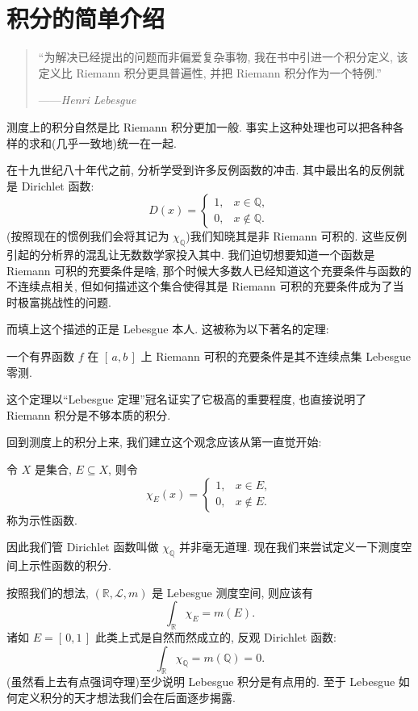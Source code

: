 \section{积分的简单介绍}
\begin{quote}
    ``为解决已经提出的问题而非偏爱复杂事物, 我在书中引进一个积分定义, 该定义比 Riemann 积分更具普遍性, 并把 Riemann 积分作为一个特例.''\par\hfill ------\emph{Henri Lebesgue}
\end{quote}

测度上的积分自然是比 Riemann 积分更加一般. 事实上这种处理也可以把各种各样的求和(几乎一致地)统一在一起.

在十九世纪八十年代之前, 分析学受到许多反例函数的冲击. 其中最出名的反例就是 Dirichlet 函数:
\[
    D(x) = \begin{cases}
        1, & x\in\mathbb Q,    \\
        0, & x\notin\mathbb Q.
    \end{cases}
\]
(按照现在的惯例我们会将其记为 $\chi_{\mathbb Q}$)我们知晓其是非 Riemann 可积的. 这些反例引起的分析界的混乱让无数数学家投入其中. 我们迫切想要知道一个函数是 Riemann 可积的充要条件是啥, 那个时候大多数人已经知道这个充要条件与函数的不连续点相关, 但如何描述这个集合使得其是 Riemann 可积的充要条件成为了当时极富挑战性的问题\enote.

而填上这个描述的正是 Lebesgue 本人. 这被称为以下著名的定理:
\begin{theorem}[Lebesgue 定理]
    一个有界函数 $f$ 在 $[\,a,b\,]$ 上 Riemann 可积的充要条件是其不连续点集 Lebesgue 零测.
\end{theorem}
这个定理以``Lebesgue 定理''冠名证实了它极高的重要程度, 也直接说明了 Riemann 积分是不够本质的积分.

回到测度上的积分上来, 我们建立这个观念应该从第一直觉开始:
\begin{defi}[示性函数]
    令 $X$ 是集合, $E\subseteq X$, 则令
    \[
        \chi_E(x) =\begin{cases}
            1, & x\in E,    \\
            0, & x\notin E.
        \end{cases}
    \]
    称为示性函数.
\end{defi}
因此我们管 Dirichlet 函数叫做 $\chi_{\mathbb Q}$ 并非毫无道理. 现在我们来尝试定义一下测度空间上示性函数的积分.

按照我们的想法, $(\mathbb R,\mathcal L,m)$ 是 Lebesgue 测度空间, 则应该有
\[
    \int_{\mathbb R}\chi_{E} = m(E).
\]
诸如 $E=[\,0,1\,]$ 此类上式是自然而然成立的, 反观 Dirichlet 函数:
\[
    \int_{\mathbb R}\chi_{\mathbb Q} = m(\mathbb Q) = 0
    .\]
(虽然看上去有点强词夺理)至少说明 Lebesgue 积分是有点用的. 至于 Lebesgue 如何定义积分的天才想法我们会在后面逐步揭露.

